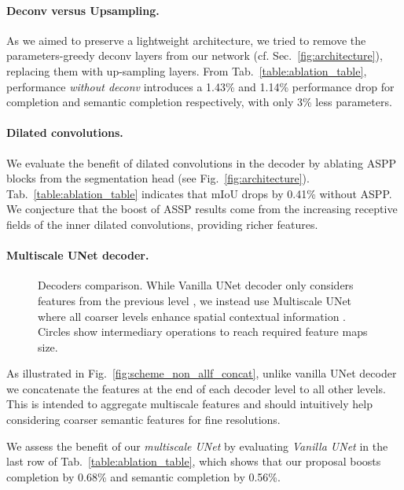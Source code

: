 \paragraph{Deconv versus Upsampling.}

As we aimed to preserve a lightweight architecture, we tried to remove the parameters-greedy deconv layers from our network (cf. Sec.~\ref{fig:architecture}), replacing them with up-sampling layers. From Tab.~\ref{table:ablation_table}, performance \textit{without deconv} introduces a 1.43\% and 1.14\% performance drop for completion and semantic completion respectively, with only 3\% less parameters.


\paragraph{Dilated convolutions.}
We evaluate the benefit of dilated convolutions in the decoder by ablating ASPP blocks from the segmentation head (see Fig.~\ref{fig:architecture}). Tab.~\ref{table:ablation_table} indicates that mIoU drops by 0.41\% without ASPP. We conjecture that the boost of ASSP results come from the increasing receptive fields of the inner dilated convolutions, providing richer features.

\paragraph{Multiscale UNet decoder.}
\begin{figure}
\centering
{}
\hspace{0.02\columnwidth}
\caption{Decoders comparison. While Vanilla UNet decoder only considers features from the previous level \protect{}, we instead use Multiscale UNet where all coarser levels enhance spatial contextual information \protect{}. Circles show intermediary operations to reach required feature maps size.}
\label{fig:schemes_decoder_vanilla_vs_mscale}
\end{figure}


As illustrated in Fig.~\ref{fig:scheme_non_allf_concat}, unlike vanilla UNet decoder we concatenate the features at the end of each decoder level to all other levels. This is intended to aggregate multiscale features and should intuitively help considering coarser semantic features for fine resolutions.

We assess the benefit of our \textit{multiscale UNet} by evaluating \textit{Vanilla UNet} in the last row of Tab.~\ref{table:ablation_table}, which shows that our proposal boosts completion by 0.68\% and semantic completion by 0.56\%.

